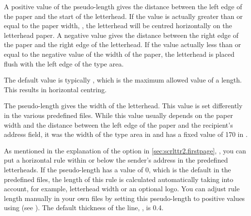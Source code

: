 \begin{Declaration}
\end{Declaration}
A positive value of the
 pseudo-length gives
the distance between the left edge of the paper and the start of the
letterhead. If the value is actually greater than or
equal to the paper width,
,
the letterhead will be centred horizontally on the letterhead paper. A
negative value gives the distance between the right edge of the paper and the
right edge of the letterhead. If the value actually less than or equal to the
negative value of the width of the paper, the letterhead is placed flush with
the left edge of the type area.

The default value is typically
, which is the maximum allowed value of
a length. This results in horizontal centring.%
\EndIndexGroup


\begin{Declaration}
\end{Declaration}
The  pseudo-length gives the width of the letterhead.
This value is set differently in the various predefined 
files. While this
value usually depends on the paper width and the distance between the left
edge of the paper and the recipient's address field, it was the width of the
type area in  and has a fixed value of 170 in
.%
\EndIndexGroup


\begin{Declaration}
\end{Declaration}
As mentioned in the explanation of the
 option in
\autoref{sec:scrlttr2.firstpage}, , you
can put a horizontal rule within or below the sender's address in the
predefined letterheads. If the 
pseudo-length has a value of 0, which is the default in the
predefined  files, the length of this rule is calculated
automatically taking into account, for example, letterhead width or an
optional logo. You can adjust rule length manually in your own 
files by setting this pseudo-length to positive values using
 (see ). The
default thickness of the line,
, is 0.4.%
\EndIndexGroup
%
\EndIndexGroup


